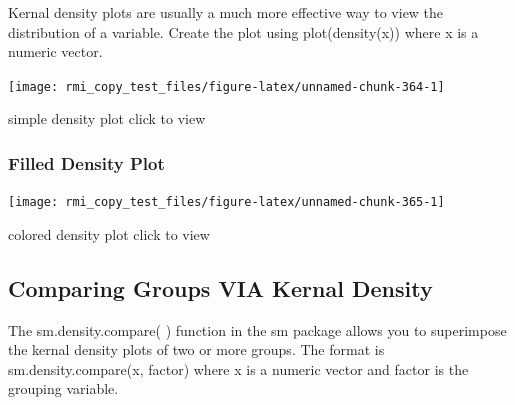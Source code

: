 \documentclass[]{book}
\newenvironment{Shaded}{\begin{snugshade}}{\end{snugshade}}
\newcommand{\KeywordTok}[1]{\textcolor[rgb]{0.13,0.29,0.53}{\textbf{#1}}}
\newcommand{\DataTypeTok}[1]{\textcolor[rgb]{0.13,0.29,0.53}{#1}}
\newcommand{\StringTok}[1]{\textcolor[rgb]{0.31,0.60,0.02}{#1}}
\newcommand{\CommentTok}[1]{\textcolor[rgb]{0.56,0.35,0.01}{\textit{#1}}}
\newcommand{\OperatorTok}[1]{\textcolor[rgb]{0.81,0.36,0.00}{\textbf{#1}}}
\newcommand{\NormalTok}[1]{#1}
\theoremstyle{definition}
\theoremstyle{definition}
\theoremstyle{definition}
\theoremstyle{remark}
\begin{document}
Kernal density plots are usually a much more effective way to view the
distribution of a variable. Create the plot using plot(density(x)) where
x is a numeric vector.

\begin{Shaded}
\end{Shaded}

\begin{center}\texttt{[image: rmi\_copy\_test\_files/figure-latex/unnamed-chunk-364-1]} \end{center}

simple density plot click to view

\subsubsection{Filled Density Plot}\label{filled-density-plot}

\begin{Shaded}
\end{Shaded}

\begin{center}\texttt{[image: rmi\_copy\_test\_files/figure-latex/unnamed-chunk-365-1]} \end{center}

colored density plot click to view

\subsection{Comparing Groups VIA Kernal
Density}\label{comparing-groups-via-kernal-density}

The sm.density.compare( ) function in the sm package allows you to
superimpose the kernal density plots of two or more groups. The format
is sm.density.compare(x, factor) where x is a numeric vector and factor
is the grouping variable.
\end{document}

